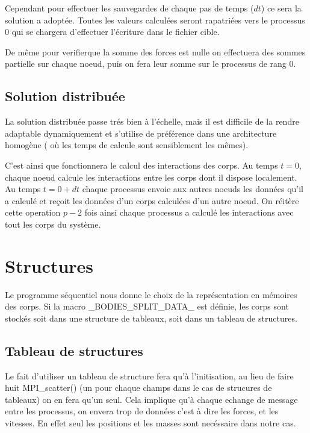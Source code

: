 \par Cependant pour effectuer les sauvegardes de chaque pas de temps ($dt$) ce sera la solution a adoptée. 
Toutes les valeurs calculées seront rapatriées vers le processus 0 qui se chargera d'effectuer 
l'écriture  dans le fichier cible.\\

\par De même pour verifierque la somme des forces est nulle on effectuera des sommes partielle
sur chaque noeud, puis on fera leur somme sur le processus de rang 0.\\

\subsection{Solution distribuée}
\par La solution distribuée passe trés bien à l'échelle, mais il est difficile de
la rendre adaptable dynamiquement et s'utilise de préférence dans une architecture homogène
( où les temps de calcule sont sensiblement les mêmes).\\

\par C'est ainsi que fonctionnera le calcul des interactions des corps. Au temps $t=0$, chaque noeud 
calcule les interactions entre les corps dont il dispose localement. Au temps $t=0+dt$ chaque
processus envoie aux autres noeuds les données qu'il a calculé et reçoit les données d'un corps
calculées d'un autre noeud. On réitère cette operation $p-2$ fois ainsi chaque processus a
calculé les interactions avec tout les corps du système.\\

\section{Structures}

\par Le programme séquentiel nous donne le choix de la représentation en mémoires des 
corps. Si la macro \_BODIES\_SPLIT\_DATA\_ est définie, les corps sont stockés soit
dans une structure de tableaux, soit dans un tableau de structures.\\


\subsection{Tableau de structures}

\par Le fait d'utiliser un tableau de structure fera qu'à l'initisation, au lieu de faire huit 
MPI\_scatter() (un pour chaque champs dans le cas de strucures de tableaux) on en fera qu'un seul.
Cela implique qu'à chaque echange de message entre les processus, on envera trop de 
données c'est à dire les forces, et les vitesses.
En effet seul les positions et les masses sont necéssaire dans notre cas.\\

